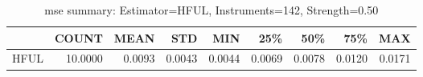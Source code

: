 \begin{table}[ht]
\centering
\caption{mse summary: Estimator=HFUL, Instruments=142, Strength=0.50}
\begin{tabular}{lrrrrrrrr}
\toprule
 & COUNT & MEAN & STD & MIN & 25\% & 50\% & 75\% & MAX \\
\midrule
HFUL & 10.0000 & 0.0093 & 0.0043 & 0.0044 & 0.0069 & 0.0078 & 0.0120 & 0.0171 \\
\bottomrule
\end{tabular}
\end{table}
